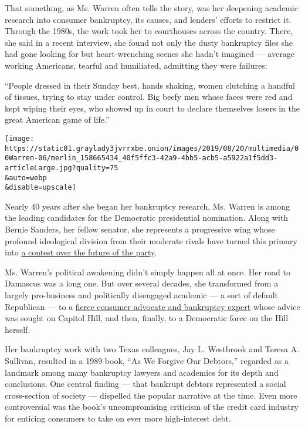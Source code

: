 That something, as Ms. Warren often tells the story, was her deepening
academic research into consumer bankruptcy, its causes, and lenders'
efforts to restrict it. Through the 1980s, the work took her to
courthouses across the country. There, she said in a recent interview,
she found not only the dusty bankruptcy files she had gone looking for
but heart-wrenching scenes she hadn't imagined --- average working
Americans, tearful and humiliated, admitting they were failures:

``People dressed in their Sunday best, hands shaking, women clutching a
handful of tissues, trying to stay under control. Big beefy men whose
faces were red and kept wiping their eyes, who showed up in court to
declare themselves losers in the great American game of life.''

\texttt{[image: https://static01.graylady3jvrrxbe.onion/images/2019/08/20/multimedia/00Warren-06/merlin\_158665434\_40f5ffc3-42a9-4bb5-acb5-a5922a1f5dd3-articleLarge.jpg?quality=75\\\&auto=webp\\\&disable=upscale]}

Nearly 40 years after she began her bankruptcy research, Ms. Warren is
among the leading candidates for the Democratic presidential nomination.
Along with Bernie Sanders, her fellow senator, she represents a
progressive wing whose profound ideological division from their moderate
rivals have turned this primary into
\href{https://www.nytimes3xbfgragh.onion/2019/07/28/us/politics/democrats-2020-trump.html}{a
contest over the future of the party}.

Ms. Warren's political awakening didn't simply happen all at once. Her
road to Damascus was a long one. But over several decades, she
transformed from a largely pro-business and politically disengaged
academic --- a sort of default Republican --- to a
\href{https://www.nytimes3xbfgragh.onion/2020/01/07/us/politics/elizabeth-warren-bankruptcy-plan-biden.html}{fierce
consumer advocate and bankruptcy expert} whose advice was sought on
Capitol Hill, and then, finally, to a Democratic force on the Hill
herself.

Her bankruptcy work with two Texas colleagues, Jay L. Westbrook and
Teresa A. Sullivan, resulted in a 1989 book, ``As We Forgive Our
Debtors,'' regarded as a landmark among many bankruptcy lawyers and
academics for its depth and conclusions. One central finding --- that
bankrupt debtors represented a social cross-section of society ---
dispelled the popular narrative at the time. Even more controversial was
the book's uncompromising criticism of the credit card industry for
enticing consumers to take on ever more high-interest debt.

